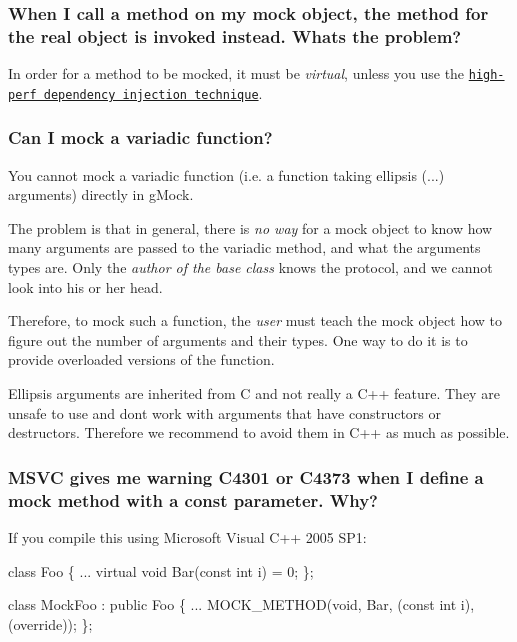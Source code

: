 \subsubsection*{When I call a method on my mock object, the method for the real object is invoked instead. What\textquotesingle{}s the problem?}

In order for a method to be mocked, it must be {\itshape virtual}, unless you use the \href{gmock_cook_book.md#MockingNonVirtualMethods}{\tt high-\/perf dependency injection technique}.

\subsubsection*{Can I mock a variadic function?}

You cannot mock a variadic function (i.\+e. a function taking ellipsis ({\ttfamily ...}) arguments) directly in g\+Mock.

The problem is that in general, there is {\itshape no way} for a mock object to know how many arguments are passed to the variadic method, and what the arguments\textquotesingle{} types are. Only the {\itshape author of the base class} knows the protocol, and we cannot look into his or her head.

Therefore, to mock such a function, the {\itshape user} must teach the mock object how to figure out the number of arguments and their types. One way to do it is to provide overloaded versions of the function.

Ellipsis arguments are inherited from C and not really a C++ feature. They are unsafe to use and don\textquotesingle{}t work with arguments that have constructors or destructors. Therefore we recommend to avoid them in C++ as much as possible.

\subsubsection*{M\+S\+VC gives me warning C4301 or C4373 when I define a mock method with a const parameter. Why?}

If you compile this using Microsoft Visual C++ 2005 S\+P1\+:


\begin{DoxyCode}
\textcolor{keyword}{class }Foo \{
  ...
  \textcolor{keyword}{virtual} \textcolor{keywordtype}{void} Bar(\textcolor{keyword}{const} \textcolor{keywordtype}{int} i) = 0;
\};

\textcolor{keyword}{class }MockFoo : \textcolor{keyword}{public} Foo \{
  ...
  MOCK\_METHOD(\textcolor{keywordtype}{void}, Bar, (\textcolor{keyword}{const} \textcolor{keywordtype}{int} i), (\textcolor{keyword}{override}));
\};
\end{DoxyCode}


